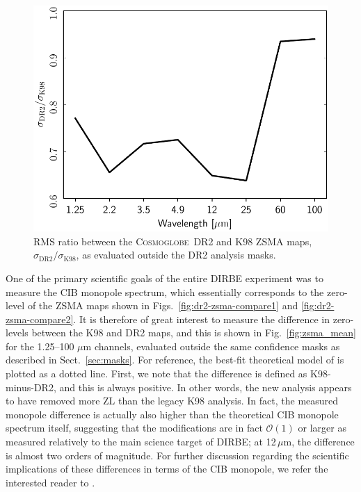 \documentclass[twocolumn]{aa}
\newcommand{\cosmoglobe}{\textsc{Cosmoglobe}}
\begin{document}
\begin{figure}
    \centering
    \includegraphics[width=\linewidth]{figs/zodi_rms_ratio_DIRBE_DR2_v2.pdf}
    \caption{RMS ratio between the \cosmoglobe\ DR2 and K98 ZSMA maps,
      $\sigma_{\mathrm{DR2}}/\sigma_\mathrm{K98}$, as evaluated
      outside the DR2 analysis masks.}
    \label{fig:zsma_rms}
\end{figure}


One of the primary scientific goals of the entire DIRBE experiment was
to measure the CIB monopole spectrum, which essentially corresponds to
the zero-level of the ZSMA maps shown in
Figs.~\ref{fig:dr2-zsma-compare1} and \ref{fig:dr2-zsma-compare2}. It
is therefore of great interest to measure the difference in
zero-levels between the K98 and DR2 maps, and this is shown in
Fig.~\ref{fig:zsma_mean} for the 1.25--100 $\mu$m channels, evaluated
outside the same confidence masks as described in
Sect.~\ref{sec:masks}. For reference, the best-fit theoretical model
of \citet{finke2022} is plotted as a dotted line. First, we note that
the difference is defined as K98-minus-DR2, and this is always
positive. In other words, the new analysis appears to have removed
more ZL than the legacy K98 analysis. In fact, the measured monopole
difference is actually also higher than the theoretical CIB monopole
spectrum itself, suggesting that the modifications are in fact
$\mathcal{O}(1)$ or larger as measured relatively to the main science
target of DIRBE; at 12$\,\mu$m, the difference is almost two orders of
magnitude. For further discussion regarding the scientific
implications of these differences in terms of the CIB monopole, we
refer the interested reader to \citet{CG02_03}.
\end{document}

